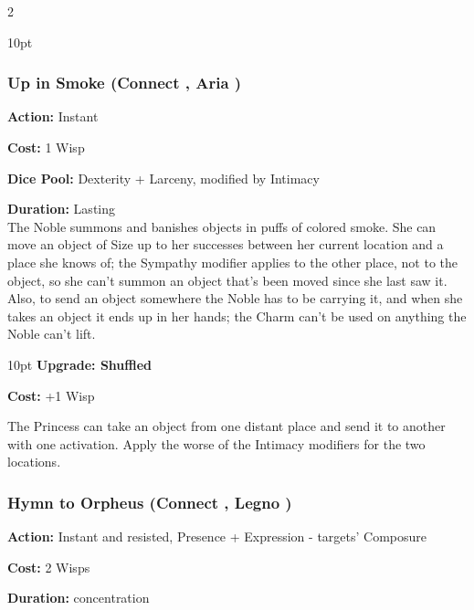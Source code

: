 \begin{multicols}{2}
\begin{myindentpar}{10pt}
	\end{myindentpar}


\subsubsection*{Up in Smoke (Connect \textbullet\textbullet\textbullet, Aria \textbullet\textbullet\textbullet)}

\noindent \textbf{Action:} Instant

\noindent \textbf{Cost:} 1 Wisp

\noindent \textbf{Dice Pool:} Dexterity + Larceny, modified by Intimacy

\noindent \textbf{Duration:} Lasting \\

\noindent The Noble summons and banishes objects in puffs of colored smoke. She can move an object of Size up to her successes between her current location and a place she knows of; the Sympathy modifier applies to the other place, not to the object, so she can’t summon an object that’s been moved since she last saw it. Also, to send an object somewhere the Noble has to be carrying it, and when she takes an object it ends up in her hands; the Charm can’t be used on anything the Noble can’t lift.

\begin{myindentpar}{10pt} \textbf{Upgrade: Shuffled}

\noindent \textbf{Cost:} +1 Wisp

The Princess can take an object from one distant place and send it to another with one activation. Apply the worse of the Intimacy modifiers for the two locations.
\end{myindentpar} 

\subsubsection*{Hymn to Orpheus (Connect \textbullet\textbullet\textbullet, Legno \textbullet\textbullet)}

\noindent \textbf{Action:} Instant and resisted, Presence + Expression - targets' Composure

\noindent \textbf{Cost:} 2 Wisps

\noindent \textbf{Duration:} concentration \\


\end{multicols}

